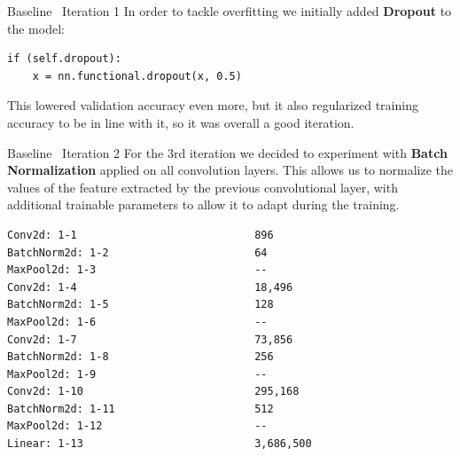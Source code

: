 \begin{frame}[fragile]{Baseline \textendash\ Iteration 1}
  In order to tackle overfitting we initially added \textbf{Dropout} to the model:

  \begin{verbatim}
if (self.dropout):
    x = nn.functional.dropout(x, 0.5)
  \end{verbatim}

  This lowered validation accuracy even more, but it also regularized training accuracy to be in line with it, 
  so it was overall a good iteration.
\end{frame}

\begin{frame}[fragile]{Baseline \textendash\ Iteration 2}
  For the 3rd iteration we decided to experiment with \textbf{Batch Normalization} applied on all convolution layers.
  This allows us to normalize the values of the feature extracted by the previous convolutional layer, 
  with additional trainable parameters to allow it to adapt during the training.

  \begin{Verbatim}[fontsize=\small]
Conv2d: 1-1                            896
BatchNorm2d: 1-2                       64
MaxPool2d: 1-3                         --
Conv2d: 1-4                            18,496
BatchNorm2d: 1-5                       128
MaxPool2d: 1-6                         --
Conv2d: 1-7                            73,856
BatchNorm2d: 1-8                       256
MaxPool2d: 1-9                         --
Conv2d: 1-10                           295,168
BatchNorm2d: 1-11                      512
MaxPool2d: 1-12                        --
Linear: 1-13                           3,686,500
  \end{Verbatim}
\end{frame}

